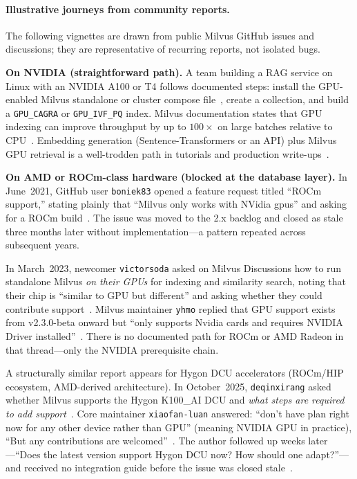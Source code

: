 \documentclass[11pt,a4paper]{article}
\begin{document}
\paragraph{Illustrative journeys from community reports.}
The following vignettes are drawn from public Milvus GitHub issues and
discussions; they are representative of recurring reports, not isolated bugs.

\medskip
\noindent\textbf{On NVIDIA (straightforward path).}
A team building a RAG service on Linux with an NVIDIA A100 or T4 follows
documented steps: install the GPU-enabled Milvus standalone or cluster compose
file~\cite{milvus-gpu-index,milvus-230-beta}, create a collection, and build a
\texttt{GPU\_CAGRA} or \texttt{GPU\_IVF\_PQ} index.
Milvus documentation states that GPU indexing can improve throughput by up to
$100\times$ on large batches relative to CPU~\cite{milvus-gpu-index}.
Embedding generation (Sentence-Transformers or an API) plus Milvus GPU retrieval
is a well-trodden path in tutorials and production write-ups~\cite{langchain-rag,milvus-home}.

\medskip
\noindent\textbf{On AMD or ROCm-class hardware (blocked at the database layer).}
In June~2021, GitHub user \texttt{boniek83} opened a feature request titled
``ROCm support,'' stating plainly that ``Milvus only works with NVidia
gpus'' and asking for a ROCm build~\cite{milvus-rocm-issue}.
The issue was moved to the 2.x backlog and closed as stale three months later
without implementation---a pattern repeated across subsequent years.

In March~2023, newcomer \texttt{victorsoda} asked on Milvus Discussions how to
run standalone Milvus \emph{on their GPUs} for indexing and similarity
search, noting that their chip is ``similar to GPU but different'' and asking
whether they could contribute support~\cite{milvus-discussion-23145}.
Milvus maintainer \texttt{yhmo} replied that GPU support exists from v2.3.0-beta
onward but ``only supports Nvidia cards and requires NVIDIA Driver
installed''~\cite{milvus-discussion-23145,milvus-230-beta}.
There is no documented path for ROCm or AMD Radeon in that thread---only the
NVIDIA prerequisite chain.

A structurally similar report appears for Hygon DCU accelerators (ROCm/HIP
ecosystem, AMD-derived architecture).
In October~2025, \texttt{deqinxirang} asked whether Milvus supports the Hygon
K100\_AI DCU and \emph{what steps are required to add support}~\cite{milvus-issue-dcu}.
Core maintainer \texttt{xiaofan-luan} answered: ``don't have plan right now for
any other device rather than GPU'' (meaning NVIDIA GPU in practice), ``But any
contributions are welcomed''~\cite{milvus-issue-dcu}.
The author followed up weeks later---``Does the latest version support Hygon DCU
now? How should one adapt?''---and received no integration guide before the
issue was closed stale~\cite{milvus-issue-dcu,milvus-accelerator-issue}.
\end{document}
